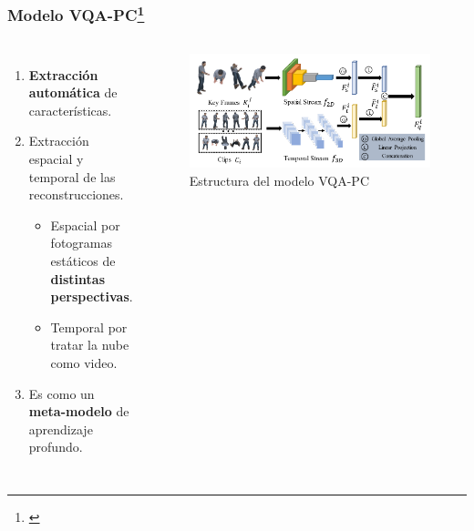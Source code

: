 \begin{frame}
  \frametitle{Modelo VQA-PC\footnote[frame]{\cite{VQA-PC}}}
  \begin{columns}
    \begin{enumerate}[<+->]
      \item \textbf{Extracción automática} de características.
      \item Extracción \alert{espacial y temporal} de las reconstrucciones.
        \begin{itemize}
          \item Espacial por fotogramas estáticos de \textbf{distintas perspectivas}.
          \item Temporal por tratar la \alert{nube como video}.
        \end{itemize}
      \item Es como un \textbf{meta-modelo} de aprendizaje profundo. 
    \end{enumerate}
    \begin{figure}
      \begin{center}
        \includegraphics[width=\textwidth]{imagenes/chapter3/PipelineCompleto}
      \end{center}
      \caption{Estructura del modelo VQA-PC}
    \end{figure}
  \end{columns}
\end{frame}

